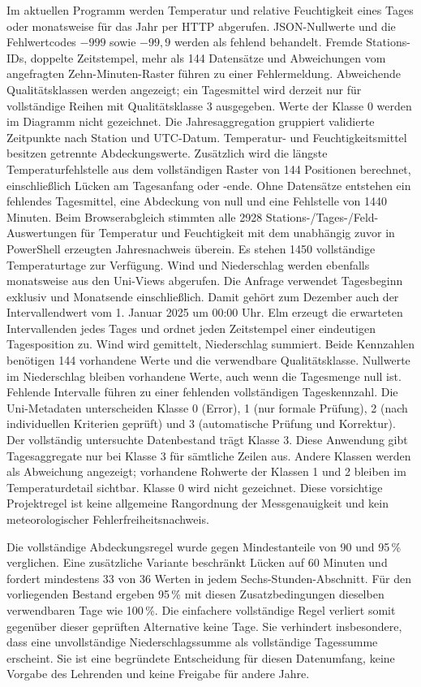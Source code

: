 \documentclass[usegeometry=true]{scrartcl}
\begin{document}
Im aktuellen Programm werden Temperatur und relative Feuchtigkeit eines
Tages oder monatsweise für das Jahr per HTTP abgerufen. JSON-Nullwerte und die Fehlwertcodes $-999$ sowie
$-99{,}9$ werden als fehlend behandelt. Fremde Stations-IDs, doppelte
Zeitstempel, mehr als 144 Datensätze und Abweichungen vom angefragten
Zehn-Minuten-Raster führen zu einer Fehlermeldung. Abweichende
Qualitätsklassen werden angezeigt; ein Tagesmittel wird derzeit nur für
vollständige Reihen mit Qualitätsklasse 3 ausgegeben. Werte der Klasse 0
werden im Diagramm nicht gezeichnet.
Die Jahresaggregation gruppiert validierte Zeitpunkte nach Station und
UTC-Datum. Temperatur- und Feuchtigkeitsmittel besitzen getrennte
Abdeckungswerte. Zusätzlich wird die längste Temperaturfehlstelle aus dem
vollständigen Raster von 144 Positionen berechnet, einschließlich Lücken am
Tagesanfang oder -ende. Ohne Datensätze entstehen ein fehlendes Tagesmittel,
eine Abdeckung von null und eine Fehlstelle von 1440 Minuten.
Beim Browserabgleich stimmten alle 2928 Stations-/Tages-/Feld-Auswertungen
für Temperatur und Feuchtigkeit mit dem unabhängig zuvor in PowerShell
erzeugten Jahresnachweis überein. Es stehen 1450 vollständige
Temperaturtage zur Verfügung.
Wind und Niederschlag werden ebenfalls monatsweise aus den Uni-Views
abgerufen. Die Anfrage verwendet Tagesbeginn exklusiv und Monatsende
einschließlich. Damit gehört zum Dezember auch der Intervallendwert vom
1. Januar 2025 um 00:00 Uhr. Elm erzeugt die erwarteten Intervallenden
jedes Tages und ordnet jeden Zeitstempel einer eindeutigen Tagesposition zu.
Wind wird gemittelt, Niederschlag summiert. Beide Kennzahlen benötigen
144 vorhandene Werte und die verwendbare Qualitätsklasse. Nullwerte im
Niederschlag bleiben vorhandene Werte, auch wenn die Tagesmenge null ist.
Fehlende Intervalle führen zu einer fehlenden vollständigen Tageskennzahl.
Die Uni-Metadaten unterscheiden Klasse 0 (Error), 1 (nur formale Prüfung),
2 (nach individuellen Kriterien geprüft) und 3 (automatische Prüfung und
Korrektur). Der vollständig untersuchte Datenbestand trägt Klasse 3.
Diese Anwendung gibt Tagesaggregate nur bei Klasse 3 für sämtliche Zeilen
aus. Andere Klassen werden als Abweichung angezeigt; vorhandene Rohwerte
der Klassen 1 und 2 bleiben im Temperaturdetail sichtbar. Klasse 0 wird
nicht gezeichnet. Diese vorsichtige Projektregel ist keine allgemeine
Rangordnung der Messgenauigkeit und kein meteorologischer
Fehlerfreiheitsnachweis.

Die vollständige Abdeckungsregel wurde gegen Mindestanteile von 90 und
95\,\% verglichen. Eine zusätzliche Variante beschränkt Lücken auf
60 Minuten und fordert mindestens 33 von 36 Werten in jedem
Sechs-Stunden-Abschnitt. Für den vorliegenden Bestand ergeben 95\,\%
mit diesen Zusatzbedingungen dieselben verwendbaren Tage wie 100\,\%.
Die einfachere vollständige Regel verliert somit gegenüber dieser
geprüften Alternative keine Tage. Sie verhindert insbesondere, dass eine
unvollständige Niederschlagssumme als vollständige Tagessumme erscheint.
Sie ist eine begründete Entscheidung für diesen Datenumfang, keine
Vorgabe des Lehrenden und keine Freigabe für andere Jahre.
\end{document}
